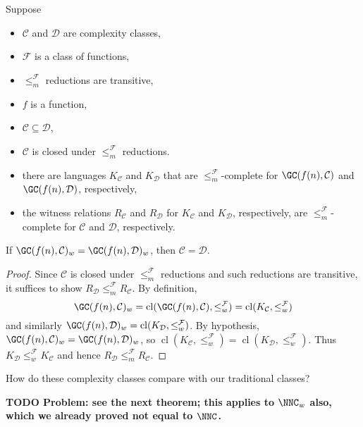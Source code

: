 \documentclass{article}
\newcommand{\todo}[1]{\textbf{TODO #1}}
\DeclareMathOperator{\cl}{cl}
\begin{document}
\begin{theorem}
  Suppose
  \begin{itemize}
  \item $\mathcal{C}$ and $\mathcal{D}$ are complexity classes,
  \item $\mathcal{F}$ is a class of functions,
  \item $\leq_m^{\mathcal{F}}$ reductions are transitive,
  \item $f$ is a function,
  \item $\mathcal{C} \subseteq \mathcal{D}$,
  \item $\mathcal{C}$ is closed under $\leq_m^\mathcal{F}$ reductions.
  \item there are languages $K_\mathcal{C}$ and $K_\mathcal{D}$ that are $\leq_m^\mathcal{F}$-complete for $\GC(f(n), \mathcal{C})$ and $\GC(f(n), \mathcal{D})$, respectively,
  \item the witness relations $R_\mathcal{C}$ and $R_\mathcal{D}$ for $K_\mathcal{C}$ and $K_\mathcal{D}$, respectively, are $\leq_m^\mathcal{F}$-complete for $\mathcal{C}$ and $\mathcal{D}$, respectively.
  \end{itemize}
  If $\GC(f(n), \mathcal{C})_w = \GC(f(n), \mathcal{D})_w$, then $\mathcal{C} = \mathcal{D}$.
\end{theorem}
\begin{proof}
  Since $\mathcal{C}$ is closed under $\leq_m^\mathcal{F}$ reductions and such reductions are transitive, it suffices to show $R_\mathcal{D} \leq_m^\mathcal{F} R_\mathcal{C}$.
  By definition,
  \begin{equation*}
    \GC(f(n), \mathcal{C})_w = \cl(\GC(f(n), \mathcal{C}), \leq_w^\mathcal{F}) = \cl(K_\mathcal{C}, \leq_w^\mathcal{F})
  \end{equation*}
  and similarly $\GC(f(n), \mathcal{D})_w = \cl(K_\mathcal{D}, \leq_w^\mathcal{F})$.
  By hypothesis, $\GC(f(n), \mathcal{C})_w = \GC(f(n), \mathcal{D})_w$, so $\cl(K_\mathcal{C}, \leq_w^\mathcal{F}) = \cl(K_\mathcal{D}, \leq_w^\mathcal{F})$.
  Thus $K_\mathcal{D} \leq_w^\mathcal{F} K_\mathcal{C}$ and hence $R_\mathcal{D} \leq_m^\mathcal{F} R_\mathcal{C}$.
\end{proof}

How do these complexity classes compare with our traditional classes?

\todo{Problem: see the next theorem; this applies to $\NNC_w$ also, which we already proved not equal to $\NNC$.}
\end{document}
